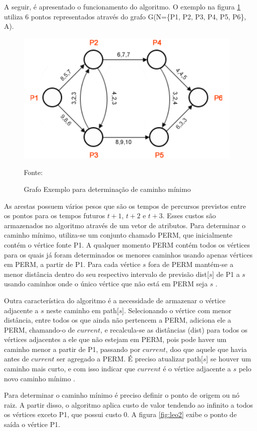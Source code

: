 A seguir, é apresentado o funcionamento do algoritmo. O exemplo na figura \ref{fig:leo1} utiliza
6 pontos representados através do grafo G(N=\{P1, P2, P3, P4, P5, P6\}, A).

\begin{figure}[htbp]
\centering
 \includegraphics[width=.55\textwidth]{chapters/fig/leo1.png}
\caption{Grafo Exemplo para determinação de caminho mínimo}
Fonte: \cite{leonard}
\label{fig:leo1}
\end{figure}

As arestas possuem vários pesos que são os tempos de percursos previstos entre os pontos para os tempos
futuros $t + 1$, $t + 2$ e $t + 3$. Esses custos são armazenados no algoritmo através de um vetor de atributos.
Para determinar o caminho mínimo, utiliza-se um conjunto chamado PERM, que inicialmente contém o vértice fonte P1.
A qualquer momento PERM contém todos os vértices para os quais já foram determinados os menores caminhos usando
apenas vértices em PERM, a partir de P1. Para cada vértice $s$ fora de PERM mantém-se a menor distância dentro do
seu respectivo intervalo de previsão dist[$s$] de P1 a $s$ usando caminhos onde o único vértice que não está em
PERM seja $s$ \cite{leonard}.

Outra característica do algoritmo é a necessidade de armazenar o vértice adjacente
a $s$ neste caminho em path[$s$]. Selecionando o vértice com menor distância, entre todos os que ainda não pertencem
a PERM, adiciona ele a PERM, chamando-o de $current$, e recalcula-se as distâncias (dist) para todos os vértices
adjacentes a ele que não estejam em PERM, pois pode haver um caminho menor a partir de P1, passando por $current$, 
doo que aquele que havia antes de $current$ ser agregado a PERM. É preciso atualizar path[$s$] se houver um caminho
mais curto, e com isso indicar que $current$ é o vértice adjacente a $s$ pelo novo caminho mínimo \cite{leonard}.

Para determinar o caminho mínimo é preciso definir o ponto de origem ou nó raiz. A partir disso, o algoritmo
aplica custo de valor tendendo ao infinito a todos os vértices exceto P1, que possui custo 0. A figura \ref{fig:leo2} exibe
o ponto de saída o vértice P1.

